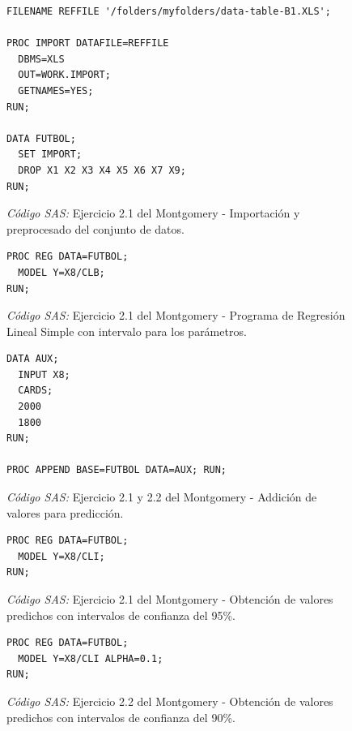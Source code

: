 \documentclass{article}
\begin{document}
    \begin{figure}[!h]
      \centering
      \begin{verbatim}
FILENAME REFFILE '/folders/myfolders/data-table-B1.XLS';

PROC IMPORT DATAFILE=REFFILE
  DBMS=XLS
  OUT=WORK.IMPORT;
  GETNAMES=YES;
RUN;

DATA FUTBOL;
  SET IMPORT;
  DROP X1 X2 X3 X4 X5 X6 X7 X9;
RUN;
      \end{verbatim}
      \caption{\emph{Código SAS:} Ejercicio 2.1 del Montgomery - Importación y preprocesado del conjunto de datos.}
      \label{code:sas-mont-1}
    \end{figure}


    \begin{figure}[!h]
      \centering
      \begin{verbatim}
PROC REG DATA=FUTBOL;
  MODEL Y=X8/CLB;
RUN;
      \end{verbatim}
      \caption{\emph{Código SAS:} Ejercicio 2.1 del Montgomery - Programa de Regresión Lineal Simple con intervalo para los parámetros.}
      \label{code:sas-mont-2}
    \end{figure}

    \begin{figure}[!h]
      \centering
      \begin{verbatim}
DATA AUX;
  INPUT X8;
  CARDS;
  2000
  1800
RUN;

PROC APPEND BASE=FUTBOL DATA=AUX; RUN;
      \end{verbatim}
      \caption{\emph{Código SAS:} Ejercicio 2.1 y 2.2 del Montgomery - Addición de valores para predicción.}
      \label{code:sas-mont-3}
    \end{figure}

    \begin{figure}[!h]
      \centering
      \begin{verbatim}
PROC REG DATA=FUTBOL;
  MODEL Y=X8/CLI;
RUN;
      \end{verbatim}
      \caption{\emph{Código SAS:} Ejercicio 2.1 del Montgomery - Obtención de valores predichos con intervalos de confianza del 95\%.}
      \label{code:sas-mont-4}
    \end{figure}

    \begin{figure}[!h]
      \centering
      \begin{verbatim}
PROC REG DATA=FUTBOL;
  MODEL Y=X8/CLI ALPHA=0.1;
RUN;
      \end{verbatim}
      \caption{\emph{Código SAS:} Ejercicio 2.2 del Montgomery - Obtención de valores predichos con intervalos de confianza del 90\%.}
      \label{code:sas-mont-5}
    \end{figure}


  \nocite{rano2017}
  \nocite{sas}
  \nocite{neter1996applied}
  \nocite{montgomery2012introduction}

  
  
\end{document}

